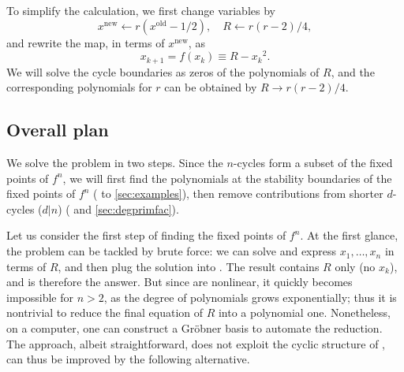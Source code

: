 \documentclass[preprint]{revtex4-1}
\begin{document}
To simplify the calculation, we first change variables \cite{saha} by
%
\[
    x^{\mathrm{new}} \leftarrow r(x^{\mathrm{old}} - 1/2),
    \quad R \leftarrow r(r-2)/4,
\]
%
and rewrite the map, in terms of $x^{\mathrm{new}}$, as
%
\begin{equation}
  x_{k+1} = f(x_k) \equiv R - {x_k}^2.
\label{eq:logmaps}
\end{equation}
%
%
We will solve the cycle boundaries as zeros of the polynomials of $R$,
and the corresponding polynomials for $r$ can be obtained by $R \rightarrow r(r-2)/4$.
%
%






\subsection{Overall plan}

We solve the problem in two steps.
Since the $n$-cycles form a subset of the fixed points of $f^n$,
we will first find
  the polynomials at the stability boundaries of
  the fixed points of $f^n$
  ( to \ref{sec:examples}),
then remove contributions from shorter $d$-cycles ($d|n$)
  ( and \ref{sec:degprimfac}).

Let us consider the first step of finding the fixed points of $f^n$.
At the first glance, the problem can be tackled by brute force:
  we can solve
   and express $x_1, \ldots, x_n$
  in terms of $R$,
  and then plug the solution into .
The result contains $R$ only (no $x_k$),
  and is therefore the answer.
But since  are nonlinear,
  it quickly becomes impossible for $n > 2$,
  as the degree of polynomials grows exponentially;
  thus it is nontrivial to reduce the final equation of $R$
  into a polynomial one.
Nonetheless, on a computer, one can
  construct a Gr\"obner basis \cite{kk1}
  to automate the reduction.
%
The approach, albeit straightforward, does not
  exploit the cyclic structure of ,
can thus be improved by the following alternative.
\end{document}

